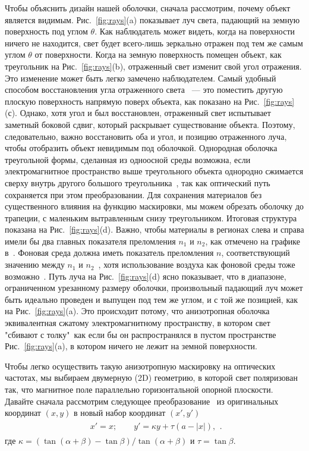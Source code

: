 \documentclass[a4paper, 12pt]{article}
\begin{document}
Чтобы объяснить дизайн нашей оболочки, сначала рассмотрим, почему объект
является видимым. Рис.~\ref{fig:rays}(a) показывает луч света, падающий
на земную поверхность под углом $\theta$. Как наблюдатель может видеть,
когда на поверхности ничего не находится, свет будет всего-лишь зеркально
отражен под тем же самым углом $\theta$ от поверхности. Когда на земную 
поверхность помещен объект, как треугольник на Рис.~\ref{fig:rays}(b),
отраженный свет изменит свой угол отражения. Это изменение может быть 
легко замечено наблюдателем. Самый удобный способом восстановления угла
отраженного света ~--- это поместить другую плоскую поверхность напрямую поверх
объекта, как показано на Рис.~\ref{fig:rays}(с). Однако, хотя угол и был 
восстановлен, отраженный свет испытывает заметный боковой сдвиг, который
раскрывает существование объекта. Поэтому, следовательно, важно восстановить
оба и угол, и позицию отраженного луча, чтобы отобразить объект невидимым
под оболочкой. Однородная оболочка треугольной формы, сделанная из одноосной
среды возможна, если электромагнитное пространство выше треугольного объекта
однородно сжимается сверху внутрь другого большого треугольника~\cite{xisheng},
так как оптический путь сохраняется при этом преобразовании. Для сохранения
материалов без существенного влияния на функцию маскировки, мы можем обрезать
оболочку до трапеции, с маленьким вытравленным снизу треугольником. Итоговая
структура показана на Рис.~\ref{fig:rays}(d). Важно, чтобы материалы
в регионах слева и справа имели бы два главных показателя преломления
$n_1$ и $n_2$, как отмечено на графике в~\cite{xisheng}. 
Фоновая среда должна иметь 
показатель преломления $n$, соответствующий значению между 
$n_1$ и $n_2$~\cite{zhang10},
хотя использование воздуха как фоновой среды тоже возможно~\cite{chen10}. 
Путь луча
на Рис.~\ref{fig:rays}(d) ясно показывает, что в диапазоне, ограниченном
урезанному размеру оболочки, произвольный падающий луч может быть идеально
проведен и выпущен под тем же углом, и с той же позицией, как на 
Рис.~\ref{fig:rays}(a). Это происходит потому, что анизотропная оболочка
эквивалентная сжатому электромагнитному пространству, в котором свет
"сбивают с толку"\, как если бы он распространялся в пустом пространстве
Рис.~\ref{fig:rays}(a), в котором ничего не лежит на земной поверхности.

Чтобы легко осуществить такую анизотропную маскировку на оптических частотах,
мы выбираем двумерную (2D) геометрию, в которой свет поляризован так, что 
магнитное поле параллельно горизонтальной опорной плоскости. Давайте сначала
рассмотрим следующее преобразование~\cite{xisheng} из оригинальных координат $(x, y)$
в новый набор координат $(x', y')$
\begin{eqnarray}
\begin{array}{c} x'=x;
\qquad
y' = \kappa y + \tau (a - |x|),
\end{array}.
\end{eqnarray}
где $\kappa = (\tan (\alpha + \beta)- \tan \beta) / \tan
(\alpha+\beta)$ и $\tau = \tan \beta$. 
\end{document}
